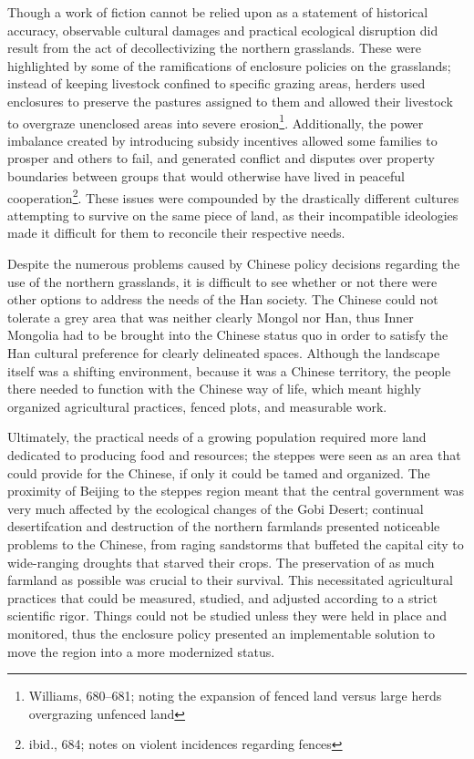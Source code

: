 Though a work of fiction cannot be relied upon as a statement of historical
accuracy, observable cultural damages and practical ecological disruption did
result from the act of decollectivizing the northern grasslands. These were
highlighted by some of the ramifications of enclosure policies on the
grasslands; instead of keeping livestock confined to specific grazing areas,
herders used enclosures to preserve the pastures assigned to them and allowed
their livestock to overgraze unenclosed areas into severe
erosion\footnote{Williams, 680--681; noting the expansion of fenced land versus
large herds overgrazing unfenced land}. Additionally, the power imbalance
created by introducing subsidy incentives allowed some families to prosper and
others to fail, and generated conflict and disputes over property boundaries
between groups that would otherwise have lived in peaceful
cooperation\footnote{ibid., 684; notes on violent incidences regarding fences}.
These issues were compounded by the drastically different cultures attempting to
survive on the same piece of land, as their incompatible ideologies made it
difficult for them to reconcile their respective needs.

Despite the numerous problems caused by Chinese policy decisions regarding the
use of the northern grasslands, it is difficult to see whether or not there were
other options to address the needs of the Han society. The Chinese could not
tolerate a grey area that was neither clearly Mongol nor Han, thus Inner
Mongolia had to be brought into the Chinese status quo in order to satisfy the
Han cultural preference for clearly delineated spaces. Although the landscape
itself was a shifting environment, because it was a Chinese territory, the
people there needed to function with the Chinese way of life, which meant highly
organized agricultural practices, fenced plots, and measurable work.

Ultimately, the practical needs of a growing population required more land
dedicated to producing food and resources; the steppes were seen as an area that
could provide for the Chinese, if only it could be tamed and organized. The
proximity of Beijing to the steppes region meant that the central government was
very much affected by the ecological changes of the Gobi Desert; continual
desertifcation and destruction of the northern farmlands presented noticeable
problems to the Chinese, from raging sandstorms that buffeted the capital city
to wide-ranging droughts that starved their crops. The preservation of as much
farmland as possible was crucial to their survival. This necessitated
agricultural practices that could be measured, studied, and adjusted according
to a strict scientific rigor. Things could not be studied unless they were held
in place and monitored, thus the enclosure policy presented an implementable
solution to move the region into a more modernized status.
